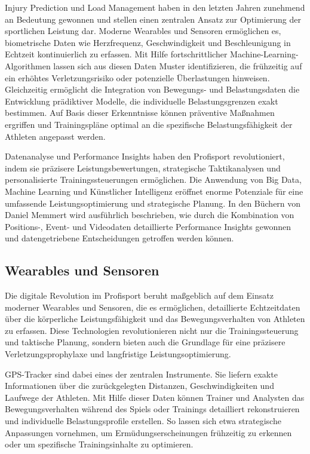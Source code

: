 \documentclass[
  number]{elsarticle}
\begin{document}
Injury Prediction und Load Management haben in den letzten Jahren
zunehmend an Bedeutung gewonnen und stellen einen zentralen Ansatz zur
Optimierung der sportlichen Leistung dar. Moderne Wearables und Sensoren
ermöglichen es, biometrische Daten wie Herzfrequenz, Geschwindigkeit und
Beschleunigung in Echtzeit kontinuierlich zu erfassen. Mit Hilfe
fortschrittlicher Machine-Learning-Algorithmen lassen sich aus diesen
Daten Muster identifizieren, die frühzeitig auf ein erhöhtes
Verletzungsrisiko oder potenzielle Überlastungen hinweisen. Gleichzeitig
ermöglicht die Integration von Bewegungs- und Belastungsdaten die
Entwicklung prädiktiver Modelle, die individuelle Belastungsgrenzen
exakt bestimmen. Auf Basis dieser Erkenntnisse können präventive
Maßnahmen ergriffen und Trainingspläne optimal an die spezifische
Belastungsfähigkeit der Athleten angepasst werden.
\citep[pp.~2-4]{MLInjuryReview}

Datenanalyse und Performance Insights haben den Profisport
revolutioniert, indem sie präzisere Leistungsbewertungen, strategische
Taktikanalysen und personalisierte Trainingssteuerungen ermöglichen. Die
Anwendung von Big Data, Machine Learning und Künstlicher Intelligenz
eröffnet enorme Potenziale für eine umfassende Leistungsoptimierung und
strategische Planung. In den Büchern von Daniel Memmert wird ausführlich
beschrieben, wie durch die Kombination von Positions-, Event- und
Videodaten detaillierte Performance Insights gewonnen und
datengetriebene Entscheidungen getroffen werden können.
\citep[pp.~264-266]{memmert_sportinformatik}

\subsection{Wearables und Sensoren}\label{wearables-und-sensoren}

Die digitale Revolution im Profisport beruht maßgeblich auf dem Einsatz
moderner Wearables und Sensoren, die es ermöglichen, detaillierte
Echtzeitdaten über die körperliche Leistungsfähigkeit und das
Bewegungsverhalten von Athleten zu erfassen. Diese Technologien
revolutionieren nicht nur die Trainingssteuerung und taktische Planung,
sondern bieten auch die Grundlage für eine präzisere
Verletzungsprophylaxe und langfristige Leistungsoptimierung.

GPS-Tracker sind dabei eines der zentralen Instrumente. Sie liefern
exakte Informationen über die zurückgelegten Distanzen,
Geschwindigkeiten und Laufwege der Athleten. Mit Hilfe dieser Daten
können Trainer und Analysten das Bewegungsverhalten während des Spiels
oder Trainings detailliert rekonstruieren und individuelle
Belastungsprofile erstellen. So lassen sich etwa strategische
Anpassungen vornehmen, um Ermüdungserscheinungen frühzeitig zu erkennen
oder um spezifische Trainingsinhalte zu optimieren.
\citep[pp.~29--35]{memmert_sporttechnologie}
\end{document}
